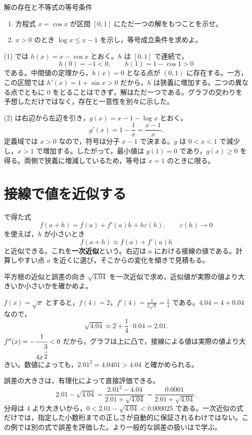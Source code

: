 \begin{example}{解の存在と不等式の等号条件}
\begin{enumerate}[label=(\arabic*),leftmargin=*]
 \item 方程式 $x=\cos x$ が区間 $[0,1]$ にただ一つの解をもつことを示せ。
 \item $x>0$ のとき $\log x\le x-1$ を示し，等号成立条件を求めよ。
\end{enumerate}
\end{example}
(1) では $h(x)=x-\cos x$ とおく。$h$ は $[0,1]$ で連続で，
\[
 h(0)=-1<0,\qquad h(1)=1-\cos1>0
\]
である。中間値の定理から，$h(x)=0$ となる点が $(0,1)$ に存在する。一方，この区間では $h'(x)=1+\sin x>0$ だから，$h$ は狭義に増加する。二つの異なる点でともに $0$ をとることはできず，解はただ一つである。グラフの交わりを予想しただけではなく，存在と一意性を別々に示した。

(2) は右辺から左辺を引き，$g(x)=x-1-\log x$ とおく。
\[
 g'(x)=1-\frac1x=\frac{x-1}{x}.
\]
定義域では $x>0$ なので，符号は分子 $x-1$ で決まる。$g$ は $0<x<1$ で減少し，$x>1$ で増加する。したがって，最小値は $g(1)=0$ であり，$g(x)\ge0$ を得る。両側で狭義に増減しているため，等号は $x=1$ のときに限る。

\section{接線で値を近似する}\label{節:一次近似}
で得た式
\[
 f(a+h)=f(a)+f'(a)h+h\varepsilon(h),\qquad \varepsilon(h)\to0
\]
を使えば，$h$ が小さいとき
\[
 f(a+h)\approx f(a)+f'(a)h
\]
と近似できる。これを\textbf{一次近似}という。右辺は $a$ における接線の値である。計算しやすい点 $a$ を近くに選び，そこからの変化を傾きで見積もる。

\begin{example}{平方根の近似と誤差の向き}
$\sqrt{4.04}$ を一次近似で求め，近似値が実際の値より大きいか小さいかを確かめよ。
\end{example}
$f(x)=\sqrt{x}$ とすると，$f(4)=2$，$f'(4)=\frac1{2\sqrt4}=\frac14$ である。$4.04=4+0.04$ なので，
\[
 \sqrt{4.04}\approx2+\frac14\cdot0.04=2.01.
\]
$f''(x)=-\cfrac1{4x^{\cfrac32}}<0$ だから，グラフは上に凸で，接線による値は実際の値より大きい。数値によっても，$2.01^2=4.0401>4.04$ と確かめられる。

誤差の大きさは，有理化によって直接評価できる。
\[
 2.01-\sqrt{4.04}
 =\frac{2.01^2-4.04}{2.01+\sqrt{4.04}}
 =\frac{0.0001}{2.01+\sqrt{4.04}}.
\]
分母は $4$ より大きいから，$0<2.01-\sqrt{4.04}<0.000025$ である。一次近似の式だけでは，指定した小数桁までの正しさが自動的に保証されるわけではない。この例では別の式で誤差を評価した。より一般的な誤差の扱いはで学ぶ。

